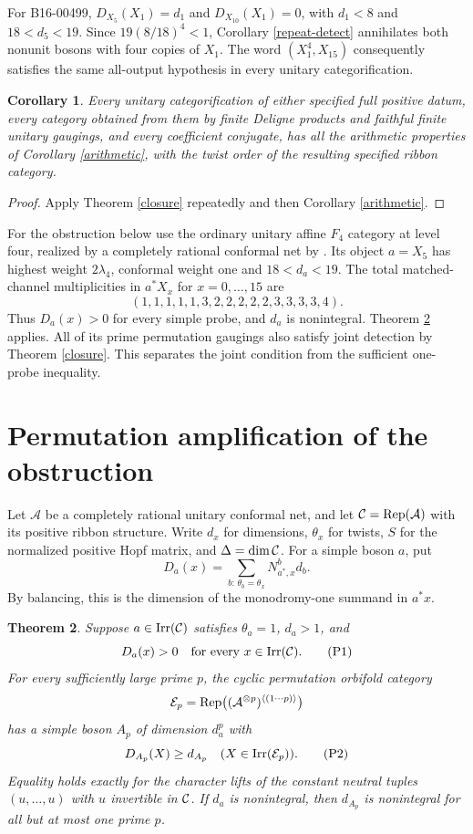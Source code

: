 \documentclass[10pt]{amsart}
\newtheorem{theorem}{Theorem}[section]
\newtheorem{corollary}[theorem]{Corollary}
\begin{document}
For B16-00499, $D_{X_5}(X_1)=d_1$ and
$D_{X_{10}}(X_1)=0$, with $d_1<8$ and $18<d_5<19$.
Since $19(8/18)^4<1$, Corollary \ref{repeat-detect}
annihilates both nonunit bosons with four copies of $X_1$.
The word $(X_1^4,X_{15})$ consequently satisfies the same
all-output hypothesis in every unitary categorification.

\begin{corollary}\label{seed-arithmetic}
Every unitary categorification of either specified full
positive datum, every category obtained from them by
finite Deligne products and faithful finite unitary gaugings,
and every coefficient conjugate, has all the arithmetic
properties of Corollary \ref{arithmetic}, with the twist
order of the resulting specified ribbon category.
\end{corollary}
\begin{proof}
Apply Theorem \ref{closure} repeatedly and then
Corollary \ref{arithmetic}.
\end{proof}

For the obstruction below use the ordinary unitary affine
$F_4$ category at level four, realized by a completely
rational conformal net by \cite[Theorem I and Theorem 3.40]{Gui}.
Its object $a=X_5$ has highest weight $2\lambda_4$,
conformal weight one and $18<d_a<19$.
The total matched-channel multiplicities in $a^*X_x$
for $x=0,\ldots,15$ are
\[
 (1,1,1,1,1,3,2,2,2,2,2,3,3,3,3,4).
\]
Thus $D_a(x)>0$ for every simple probe, and $d_a$ is
nonintegral. Theorem \ref{permutation-main} applies.
All of its prime permutation gaugings also satisfy joint
detection by Theorem \ref{closure}. This separates the
joint condition from the sufficient one-probe inequality.


\section{Permutation amplification of the obstruction}
Let $\mathcal A$ be a completely rational unitary conformal net,
and let $\mathcal C=\operatorname{Rep}(\mathcal A)$ with its positive ribbon
structure. Write $d_x$ for dimensions, $\theta_x$ for twists,
$S$ for the normalized positive Hopf matrix, and $\Delta=\dim\mathcal C$.
For a simple boson $a$, put
\[
 D_a(x)=\sum_{b:\,\theta_b=\theta_x}N_{a^*,x}^b d_b.
\]
By balancing, this is the dimension of
the monodromy-one summand in $a^*x$.

\begin{theorem}\label{permutation-main}
Suppose $a\in\operatorname{Irr}(\mathcal C)$ satisfies $\theta_a=1$, $d_a>1$,
and
\[
 D_a(x)>0\quad\text{for every }x\in\operatorname{Irr}(\mathcal C).
                                                               \tag{P1}
\]
For every sufficiently large prime $p$, the cyclic permutation
orbifold category
\[
 \mathcal E_p=\operatorname{Rep}
       \bigl((\mathcal A^{\otimes p})^{\langle(1\cdots p)\rangle}\bigr)
\]
has a simple boson $A_p$ of dimension $d_a^p$ with
\[
               D_{A_p}(X)\ge d_{A_p}\quad(X\in\operatorname{Irr}(\mathcal E_p)).        \tag{P2}
\]
Equality holds exactly for the character lifts of the constant
neutral tuples $(u,\ldots,u)$ with $u$ invertible in $\mathcal C$.
If $d_a$ is nonintegral, then $d_{A_p}$ is nonintegral for
all but at most one prime $p$.
\end{theorem}
\end{document}
